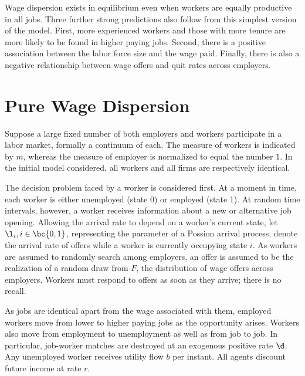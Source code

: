 \documentclass[12pt]{article}
\theoremstyle{definition}
\begin{document}
Wage dispersion exists in equilibrium even when workers are equally productive in all jobs. Three further strong predictions also follow from this simplest version of the model. First, more experienced workers and those with more tenure are more likely to be found in higher paying jobs. Second, there is a positive association between the labor force size and the wage paid. Finally, there is also a negative relationship between wage offers and quit rates across employers. 


\section{Pure Wage Dispersion}

Suppose a large fixed number of both employers and workers participate in a labor market, formally a continuum of each. The measure of workers is indicated by $m$, whereas the measure of employer is normalized to equal the number $1$. In the initial model considered, all workers and all firms are respectively identical. 

The decision problem faced by a worker is considered first. At a moment in time, each worker is either unemployed (state 0) or employed (state 1). At random time intervals, however, a worker receives information about a new or alternative job opening. Allowing the arrival rate to depend on a worker's current state, let $\l_i, i \in \bc{0, 1}$, representing the parameter of a Possion arrival process, denote the arrival rate of offers while a worker is currently occupying state $i$. As workers are assumed to randomly search among employers, an offer is assumed to be the realization of a random draw from $F$, the distribution of wage offers across employers. Workers must respond to offers as soon as they arrive; there is no recall. 

As jobs are identical apart from the wage associated with them, employed workers move from lower to higher paying jobs as the opportunity arises. Workers also move from employment to unemployment as well as from job to job. In particular, job-worker matches are destroyed at an exogenous positive rate $\d$. Any unemployed worker receives utility flow $b$ per instant. All agents discount future income at rate $r$. 
\end{document}
